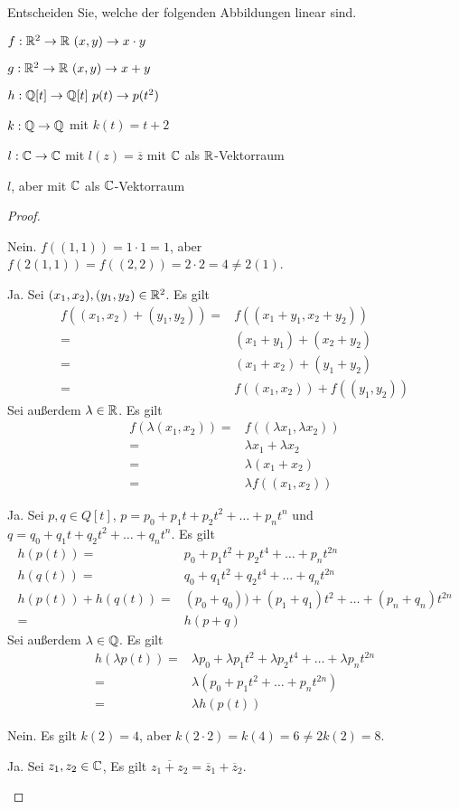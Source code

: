 \begin{Problem}\label{pr:linalg1blatt8-1}
Entscheiden Sie, welche der folgenden Abbildungen linear sind.	
\begin{parts}
	\item $f:\mathbb{R}^2\to \mathbb{R}~(x,y)\to x\cdot y$ 
	\item $g:\mathbb{R}^2\to \mathbb{R}~(x,y)\to x+y$ 
	\item $h:\mathbb{Q}[t]\to \mathbb{Q}[t]~p(t)\to p(t^2)$ 
	\item $k:\mathbb{Q}\to \mathbb{Q}$ mit $k(t)=t+2$ 
	\item $l:\mathbb{C}\to \mathbb{C}$ mit $l(z)=\overline{z}$ mit $\mathbb{C}$ als $\mathbb{R}$-Vektorraum
	\item $l$, aber mit $\mathbb{C}$ als $\mathbb{C}$-Vektorraum
\end{parts}
\end{Problem}
\begin{proof}
	\begin{parts}
	\item Nein. $f((1,1))=1\cdot 1 = 1$, aber $f(2(1,1))=f((2,2))=2\cdot 2=4\neq 2(1)$.
	\item Ja. Sei $(x_1,x_2),(y_1,y_2)\in \mathbb{R}^2$. Es gilt
		\begin{align*}
			f((x_1,x_2)+(y_1,y_2))=&f((x_1+y_1,x_2+y_2))\\
			=&(x_1+y_1)+(x_2+y_2)\\
			=&(x_1+x_2)+(y_1+y_2)\\
			=&f((x_1,x_2))+f((y_1,y_2))
		\end{align*}
		Sei außerdem $\lambda \in \mathbb{R}$. Es gilt
		\begin{align*}
			f(\lambda(x_1,x_2))=&f((\lambda x_1, \lambda x_2))\\
			=& \lambda x_1+\lambda x_2\\
			=& \lambda(x_1+x_2)\\
			=&\lambda f((x_1,x_2))
		\end{align*}
	\item Ja. Sei $p,q\in Q[t]$, $p=p_0+p_1t+p_2t^2+\dots + p_n t^n$ und $q=q_0+q_1t+q_2t^2+\dots+q_nt^n$. Es gilt
		\begin{align*}
			h(p(t))=&p_0+p_1t^2+p_2t^4+\dots+p_nt^{2n}\\
			h(q(t))=&q_0+q_1t^2+q_2t^4+\dots+q_nt^{2n}\\
			h(p(t))+h(q(t))=&(p_0+q_0))+(p_1+q_1)t^2+\dots+(p_n+q_n)t^{2n}\\
			=&h(p+q)
		\end{align*}
		Sei außerdem $\lambda\in \mathbb{Q}$. Es gilt
		\begin{align*}
			h(\lambda p(t))=&\lambda p_0+\lambda p_1t^2+\lambda p_2t^4+\dots+\lambda p_n t^{2n}\\
			=& \lambda\left( p_0+p_1t^2+\dots+p_nt^{2n} \right) \\
			=&\lambda h(p(t))
		\end{align*}
	\item Nein. Es gilt $k(2)=4$, aber $k(2\cdot 2)=k(4)=6\neq 2 k(2)=8$.
	\item Ja. Sei $z_1,z_2\in \mathbb{C}$, Es gilt $\overline{z_1+z_2}=\overline{z}_1+\overline{z}_2$. 


\end{parts}
\end{proof}
